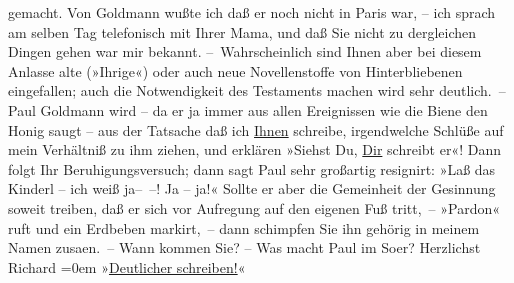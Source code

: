 \begin{ledgroupsized}[t]{13cm}
               gemacht. Von Goldmann wußte ich daß er noch nicht
               in Paris war, – ich sprach am selben {\pb}Tag telefonisch mit Ihrer Mama, und daß Sie nicht zu
               dergleichen Dingen gehen war mir bekannt.\pend
           \pstart
           – Wahrscheinlich sind Ihnen aber bei diesem Anlasse alte (»Ihrige«) oder auch neue
               Novellenstoffe von Hinterbliebenen eingefallen; auch {\pb}die Notwendigkeit des Testaments
               machen wird sehr deutlich. –\pend
           \pstart
           Paul Goldmann wird – da er ja immer aus allen
               Ereignissen wie die Biene den Honig saugt – aus der Tatsache daß ich \uline{Ihnen}
                schreibe, irgendwelche Schlüße auf mein Verhältniß zu
               ihm ziehen, und erklären {\pb}»Siehst
               Du, \uline{Dir}
                schreibt er«! Dann folgt Ihr
               Beruhigungsversuch; dann sagt Paul
                sehr großartig
               resignirt: »Laß das Kinderl – ich weiß ja– –! Ja – ja!« Sollte er aber die
               Gemeinheit der Gesinnung soweit treiben, daß er sich vor Aufregung {\pb}auf den eigenen Fuß tritt, –
               »Pardon« ruft und ein Erdbeben markirt, – dann schimpfen Sie ihn gehörig in
               meinem Namen zusa{\geminationm}en. –\pend
           \pstart
           Wann kommen Sie? –\pend
           \pstart
           Was macht Paul im So{\geminationm}er?\pend
           \pstart
           Herzlichst{\\[\baselineskip]}\spacefill\mbox{Richard}\pend
           \leftskip=0em{}\pstart
           »\uline{Deutlicher schreiben!}«\pend
           \endnumbering{}\end{ledgroupsized}  \newcommand{\dateiname}{L00675}\newcommand{\titel}{Richard Beer-Hofmann an Arthur Schnitzler, 12. 5. 1897}\newcommand{\editorInnen}{Martin Anton Müller und Gerd-Hermann Susen}
      